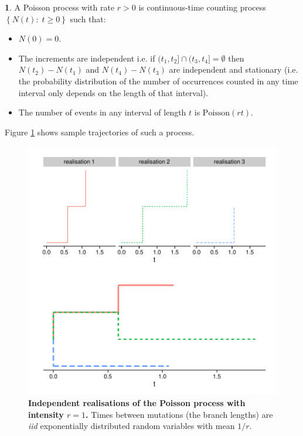 \documentclass[12pt,twoside]{mitthesis}
\theoremstyle{plain}
\theoremstyle{definition}
\newtheorem{defn}[thm]{\protect\definitionname}
\theoremstyle{remark}
\providecommand{\definitionname}{Definition}
\begin{document}
\begin{defn} 
A Poisson process with rate $r>0$ is continuous-time counting process $\left\{ N(t):\; t\geq0\right\}$ such that:

\begin{itemize}
\item $N(0)=0$.
\item The increments are independent i.e. if $(t_{1},t_{2}]\cap(t_{3},t_{4}]=\emptyset$ then $N(t_2)-N(t_1)$ and $N(t_4)-N(t_3)$ are independent and stationary (i.e. the probability distribution of the number of occurrences counted in any time interval only depends on the length of that interval).
\item The number of events in any interval of length $t$ is $\text{Poisson}(r t)$.
\end{itemize}

Figure \ref{fig:poisson} shows sample trajectories of such a process.

\label{def:poisson}
\end{defn}

\begin{figure}[H]
\begin{center}
\includegraphics[scale=0.5]{poisson}
\end{center}
\caption{{ \footnotesize {\bf Independent realisations of the Poisson process with intensity $r=1$.}
Times between mutations (the branch lengths) are \emph{iid} exponentially distributed random variables with mean $1/r$.
}}
\label{fig:poisson}
\end{figure}
\end{document}
